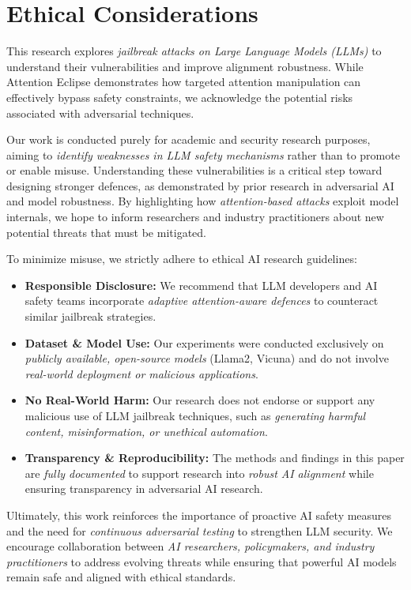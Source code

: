 \section{Ethical Considerations}


This research explores \textit{jailbreak attacks on Large Language Models (LLMs)} to understand their vulnerabilities and improve alignment robustness. While Attention Eclipse demonstrates how targeted attention manipulation can effectively bypass safety constraints, we acknowledge the potential risks associated with adversarial techniques.

Our work is conducted purely for academic and security research purposes, aiming to \textit{identify weaknesses in LLM safety mechanisms} rather than to promote or enable misuse. Understanding these vulnerabilities is a critical step toward designing stronger defences, as demonstrated by prior research in adversarial AI and model robustness. By highlighting how \textit{attention-based attacks} exploit model internals, we hope to inform researchers and industry practitioners about new potential threats that must be mitigated.

To minimize misuse, we strictly adhere to ethical AI research guidelines:
\begin{itemize}
    \item \textbf{Responsible Disclosure:} We recommend that LLM developers and AI safety teams incorporate \textit{adaptive attention-aware defences} to counteract similar jailbreak strategies.
    \item \textbf{Dataset \& Model Use:} Our experiments were conducted exclusively on \textit{publicly available, open-source models} (Llama2, Vicuna) and do not involve \textit{real-world deployment or malicious applications}.
    \item \textbf{No Real-World Harm:} Our research does not endorse or support any malicious use of LLM jailbreak techniques, such as \textit{generating harmful content, misinformation, or unethical automation}.
    \item \textbf{Transparency \& Reproducibility:} The methods and findings in this paper are \textit{fully documented} to support research into \textit{robust AI alignment} while ensuring transparency in adversarial AI research.
\end{itemize}

Ultimately, this work reinforces the importance of proactive AI safety measures and the need for \textit{continuous adversarial testing} to strengthen LLM security. We encourage collaboration between \textit{AI researchers, policymakers, and industry practitioners} to address evolving threats while ensuring that powerful AI models remain safe and aligned with ethical standards.
